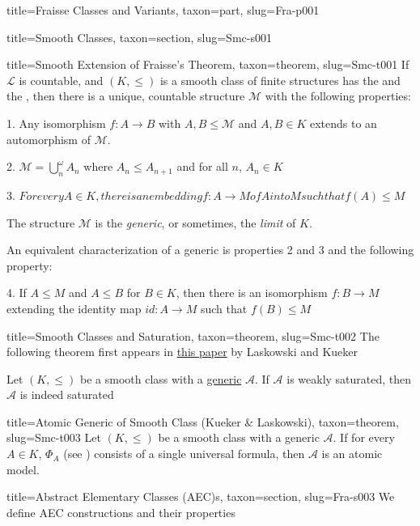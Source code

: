 \documentclass[a4paper]{article}
\begin{document}
\begin{tree}{title={Fraisse Classes and Variants}, taxon={part}, slug={Fra-p001}}
\begin{tree}{title={Smooth Classes}, taxon={section}, slug={Smc-s001}}
\begin{tree}{title={Smooth Extension of Fraisse's Theorem}, taxon={theorem}, slug={Smc-t001}}
If \(\mathcal {L}\) is countable, and \((K, \leq )\) is a smooth class of finite structures has the  and the , 
then there is a unique, countable structure \(\mathcal {M}\)  with the following properties:\par{1. Any isomorphism \(f:A \rightarrow  B\) with \(A,B \leq   \mathcal {M}\) and \(A,B \in  K\) extends to
an automorphism of \(\mathcal {M}\).}\par{2. \(\mathcal {M} =  \bigcup ^ \omega _n A_n\) where \(A_n  \leq  A_{n+1}\) and for all \(n\), \(A_n \in  K\)}\par{3. \(For every  A \in  K , there is an embedding  f:A \rightarrow  M  of  A  into  M  such that  f(A)  \leq  M\)}\par{The structure \(\mathcal {M}\) is the \emph{generic}, or sometimes, the \emph{limit} of \(K\).}\par{An equivalent characterization of a generic is properties 2 and 3 and the following property:}\par{4. If \(A \leq  M\) and \(A \leq  B\) for \(B \in  K\), then there is an isomorphism \(f: B \rightarrow  M\) extending the identity map \(id: A \rightarrow  M\) 
such that \(f(B)  \leq  M\)}
\end{tree}

\begin{tree}{title={Smooth Classes and Saturation}, taxon={theorem}, slug={Smc-t002}}
The following theorem first appears in \href{}{this paper} by Laskowski and Kueker\par{Let \((K,  \leq )\) be a smooth class with a \href{}{generic} \(\mathcal {A}\). If \(\mathcal {A}\) is weakly saturated, then \(\mathcal {A}\) is indeed saturated}
\end{tree}

\begin{tree}{title={Atomic Generic of Smooth Class (Kueker & Laskowski)}, taxon={theorem}, slug={Smc-t003}}
Let \((K, \leq )\) be a smooth class with a generic \(\mathcal {A}\). If for every \(A  \in  K\), \(\Phi _A\) (see ) consists of a single universal formula,
then \(\mathcal {A}\) is an atomic model.
\end{tree}

\end{tree}

\begin{tree}{title={Abstract Elementary Classes (AEC)s}, taxon={section}, slug={Fra-s003}}
We define AEC constructions and their properties
\end{tree}

\end{tree}
\end{document}
